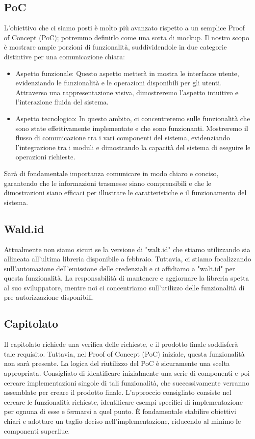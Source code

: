 \subsection{PoC}
L'obiettivo che ci siamo posti è molto più avanzato rispetto a un semplice Proof of Concept (PoC); potremmo definirlo come una sorta di mockup. Il nostro scopo è mostrare ampie porzioni di funzionalità, suddividendole in due categorie distintive per una comunicazione chiara:
\begin{itemize}
  \item Aspetto funzionale: Questo aspetto metterà in mostra le interfacce utente, evidenziando le funzionalità e le operazioni disponibili per gli utenti. Attraverso una rappresentazione visiva, dimostreremo l'aspetto intuitivo e l'interazione fluida del sistema.
  \item Aspetto tecnologico: In questo ambito, ci concentreremo sulle funzionalità che sono state effettivamente implementate e che sono funzionanti. Mostreremo il flusso di comunicazione tra i vari componenti del sistema, evidenziando l'integrazione tra i moduli e dimostrando la capacità del sistema di eseguire le operazioni richieste.
\end{itemize}
Sarà di fondamentale importanza comunicare in modo chiaro e conciso, garantendo che le informazioni trasmesse siano comprensibili e che le dimostrazioni siano efficaci per illustrare le caratteristiche e il funzionamento del sistema.

\subsection{Wald.id}
Attualmente non siamo sicuri se la versione di "walt.id" che stiamo utilizzando sia allineata all'ultima libreria disponibile a febbraio. Tuttavia, ci stiamo focalizzando sull'automazione dell'emissione delle credenziali e ci affidiamo a "walt.id" per questa funzionalità. La responsabilità di mantenere e aggiornare la libreria spetta al suo sviluppatore, mentre noi ci concentriamo sull'utilizzo delle funzionalità di pre-autorizzazione disponibili.

\subsection{Capitolato}
Il capitolato richiede una verifica delle richieste, e il prodotto finale soddisferà tale requisito. Tuttavia, nel Proof of Concept (PoC) iniziale, questa funzionalità non sarà presente.
La logica del riutilizzo del PoC è sicuramente una scelta appropriata. Consigliato di identificare inizialmente una serie di componenti e poi cercare implementazioni singole di tali funzionalità, che successivamente verranno assemblate per creare il prodotto finale.
L'approccio consigliato consiste nel cercare le funzionalità richieste, identificare esempi specifici di implementazione per ognuna di esse e fermarsi a quel punto. È fondamentale stabilire obiettivi chiari e adottare un taglio deciso nell'implementazione, riducendo al minimo le componenti superflue.